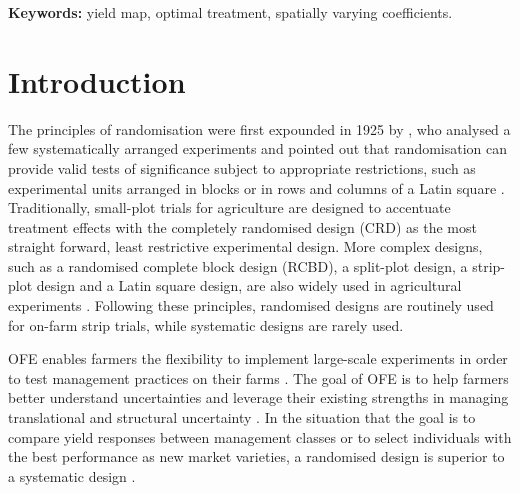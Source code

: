 \documentclass[a4paper]{article} 	%
\begin{document}
 
{\bf Keywords:} yield map, optimal treatment, spatially varying coefficients. 

\section{Introduction}\label{Sec:Intro}

The principles of randomisation were first expounded in 1925 by \textcite{Fisher1934Statistical}, who analysed a few systematically arranged experiments and pointed out that randomisation can provide valid tests of significance subject to appropriate restrictions, such as experimental units arranged in blocks or in rows and columns of a Latin square \parencite{Verdooren2020History}. Traditionally, small-plot trials for agriculture are designed to accentuate treatment effects with the completely randomised design (CRD) as the most straight forward, least restrictive experimental design. More complex designs, such as a randomised complete block design (RCBD), a split-plot design, a strip-plot design and a Latin square design, are also widely used in agricultural experiments \parencite{Petersen1994Agricultural}. Following these principles, randomised designs are routinely used for on-farm strip trials, while systematic designs are rarely used.





OFE enables farmers the flexibility to implement large-scale experiments in order to test management practices on their farms \parencite{Evans2020Assessment}. The goal of OFE is to help farmers better understand uncertainties and leverage their existing strengths in managing translational and structural uncertainty \parencite{Cook2013Onfarm}. In the situation that the goal is to compare yield responses between management classes or to select individuals with the best performance as new market varieties, a randomised design is superior to a systematic design \parencite{Pringle2004FieldScale, Selle2019Flexible}. 
\end{document}
